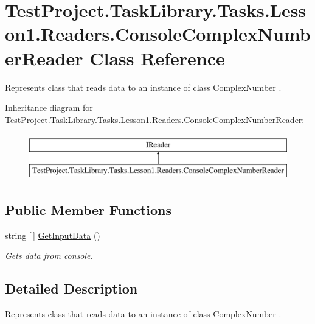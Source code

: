 \hypertarget{class_test_project_1_1_task_library_1_1_tasks_1_1_lesson1_1_1_readers_1_1_console_complex_number_reader}{}\section{Test\+Project.\+Task\+Library.\+Tasks.\+Lesson1.\+Readers.\+Console\+Complex\+Number\+Reader Class Reference}
\label{class_test_project_1_1_task_library_1_1_tasks_1_1_lesson1_1_1_readers_1_1_console_complex_number_reader}


Represents class that reads data to an instance of class Complex\+Number .  


Inheritance diagram for Test\+Project.\+Task\+Library.\+Tasks.\+Lesson1.\+Readers.\+Console\+Complex\+Number\+Reader\+:\begin{figure}[H]
\begin{center}
\leavevmode
\includegraphics[height=2.000000cm]{class_test_project_1_1_task_library_1_1_tasks_1_1_lesson1_1_1_readers_1_1_console_complex_number_reader}
\end{center}
\end{figure}
\subsection*{Public Member Functions}
\begin{DoxyCompactItemize}
\item 
string \mbox{[}$\,$\mbox{]} \mbox{\hyperlink{class_test_project_1_1_task_library_1_1_tasks_1_1_lesson1_1_1_readers_1_1_console_complex_number_reader_aab6af1e87e0e2b0744c86baa86fe7da7}{Get\+Input\+Data}} ()
\begin{DoxyCompactList}\small\item\em Gets data from console. \end{DoxyCompactList}\end{DoxyCompactItemize}


\subsection{Detailed Description}
Represents class that reads data to an instance of class Complex\+Number . 



